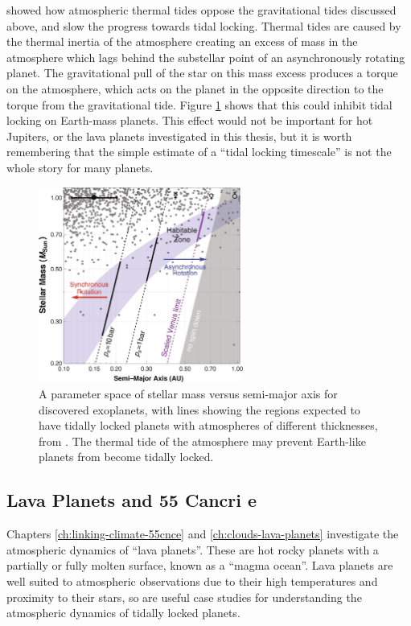 \citet{leconte2015asynchronous} showed how atmospheric thermal tides oppose the gravitational tides discussed above, and slow the progress towards tidal locking. Thermal tides are caused by the thermal inertia of the atmosphere creating an excess of mass in the atmosphere  which lags behind the substellar point of an asynchronously rotating planet. The gravitational pull of the star on this mass excess produces a torque on the atmosphere, which acts on the planet in the opposite direction to the torque from the gravitational tide. Figure \ref{fig:review-leconte-tl} shows that this could inhibit tidal locking on Earth-mass planets. This effect would not be important for hot Jupiters, or the lava planets investigated in this thesis, but it is worth remembering that the simple estimate of a ``tidal locking timescale'' is not the whole story for many planets.

\begin{figure}
  \centering
  \includegraphics[width=0.6\textwidth]{figures/lit-review/leconte-tl.jpg}
\caption{A parameter space of stellar mass versus semi-major axis for discovered exoplanets, with lines showing the regions expected to have tidally locked planets with atmospheres of different thicknesses, from \citet{leconte2015asynchronous}. The thermal tide of the atmosphere may prevent Earth-like planets from become tidally locked.}\label{fig:review-leconte-tl}
\end{figure}


\subsection{Lava Planets and 55 Cancri e}

Chapters \ref{ch:linking-climate-55cnce} and \ref{ch:clouds-lava-planets} investigate the atmospheric dynamics of ``lava planets''. These are hot rocky planets with a partially or fully molten surface, known as a ``magma ocean''. Lava planets are well suited to atmospheric observations due to their high temperatures and proximity to their stars, so are useful case studies for understanding the atmospheric dynamics of tidally locked planets.

